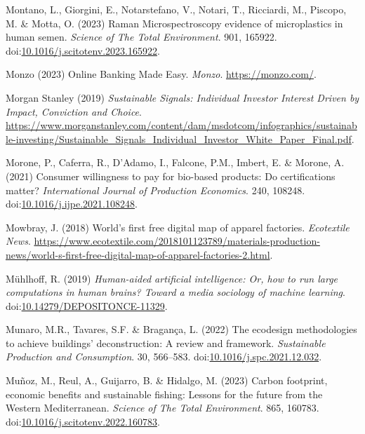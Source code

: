 \documentclass[
  letterpaper,
  DIV=11,
  numbers=noendperiod]{scrartcl}
\newlength{\cslhangindent}
\newenvironment{CSLReferences}[2] %
 {\begin{list}{}{%
  \setlength{\itemindent}{0pt}
  \setlength{\leftmargin}{0pt}
  \setlength{\parsep}{0pt}
  \ifodd #1
   \setlength{\leftmargin}{\cslhangindent}
   \setlength{\itemindent}{-1\cslhangindent}
  \fi
  \setlength{\itemsep}{#2\baselineskip}}}
 {\end{list}}
\begin{document}
\begin{CSLReferences}{0}{1}
Montano, L., Giorgini, E., Notarstefano, V., Notari, T., Ricciardi, M.,
Piscopo, M. \& Motta, O. (2023) Raman {Microspectroscopy} evidence of
microplastics in human semen. \emph{Science of The Total Environment}.
901, 165922.
doi:\href{https://doi.org/10.1016/j.scitotenv.2023.165922}{10.1016/j.scitotenv.2023.165922}.

Monzo (2023) Online {Banking Made Easy}. \emph{Monzo}.
\url{https://monzo.com/}.

Morgan Stanley (2019) \emph{Sustainable {Signals}: {Individual Investor
Interest Driven} by {Impact}, {Conviction} and {Choice}}.
\url{https://www.morganstanley.com/content/dam/msdotcom/infographics/sustainable-investing/Sustainable_Signals_Individual_Investor_White_Paper_Final.pdf}.

Morone, P., Caferra, R., D'Adamo, I., Falcone, P.M., Imbert, E. \&
Morone, A. (2021) Consumer willingness to pay for bio-based products:
{Do} certifications matter? \emph{International Journal of Production
Economics}. 240, 108248.
doi:\href{https://doi.org/10.1016/j.ijpe.2021.108248}{10.1016/j.ijpe.2021.108248}.

Mowbray, J. (2018) World's first free digital map of apparel factories.
\emph{Ecotextile News}.
\url{https://www.ecotextile.com/2018101123789/materials-production-news/world-s-first-free-digital-map-of-apparel-factories-2.html}.

Mühlhoff, R. (2019) \emph{Human-aided artificial intelligence: {Or}, how
to run large computations in human brains? {Toward} a media sociology of
machine learning}.
doi:\href{https://doi.org/10.14279/DEPOSITONCE-11329}{10.14279/DEPOSITONCE-11329}.

Munaro, M.R., Tavares, S.F. \& Bragança, L. (2022) The ecodesign
methodologies to achieve buildings' deconstruction: {A} review and
framework. \emph{Sustainable Production and Consumption}. 30, 566--583.
doi:\href{https://doi.org/10.1016/j.spc.2021.12.032}{10.1016/j.spc.2021.12.032}.

Muñoz, M., Reul, A., Guijarro, B. \& Hidalgo, M. (2023) Carbon
footprint, economic benefits and sustainable fishing: {Lessons} for the
future from the {Western Mediterranean}. \emph{Science of The Total
Environment}. 865, 160783.
doi:\href{https://doi.org/10.1016/j.scitotenv.2022.160783}{10.1016/j.scitotenv.2022.160783}.


\end{CSLReferences}
\end{document}
